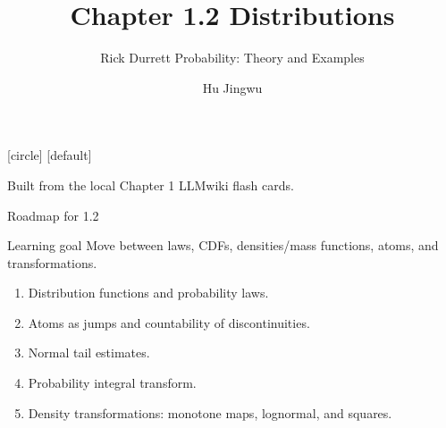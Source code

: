 [circle]
[default]

\usepackage{amsmath,amssymb,mathtools}
\usepackage{booktabs}

\newcommand{\OmegaSpace}{\Omega}
\newcommand{\F}{\mathcal{F}}
\newcommand{\B}{\mathcal{B}}
\newcommand{\R}{\mathbb{R}}
\newcommand{\Prob}{\mathbb{P}}
\newcommand{\E}{\mathbb{E}}
\newcommand{\Q}{\mathbb{Q}}
\newcommand{\one}{\mathbf{1}}
\newcommand{\vikiname}[1]{\par\smallskip{\scriptsize\color{blue!60!black}\textbf{LLMwiki:} \texttt{\detokenize{#1}}}}
\newcommand{\blankproof}{%
  \vspace{2mm}
  {\color{gray!55}\rule{\linewidth}{0.4pt}}\par\vspace{5mm}
  {\color{gray!55}\rule{\linewidth}{0.4pt}}\par\vspace{5mm}
  {\color{gray!55}\rule{\linewidth}{0.4pt}}\par\vspace{5mm}
  {\color{gray!55}\rule{\linewidth}{0.4pt}}\par
}
\newcommand{\proofblock}[1]{\ifteacher #1 \else \blankproof \fi}

\title[Chapter 1.2]{Chapter 1.2 Distributions}
\subtitle{Rick Durrett Probability: Theory and Examples}
\author{Hu Jingwu}
\date{}



\begin{frame}
  \titlepage
  \vspace{-5mm}
  \begin{center}
    \small Built from the local Chapter 1 LLMwiki flash cards.
  \end{center}
\end{frame}

\begin{frame}{Roadmap for 1.2}
  \begin{block}{Learning goal}
    Move between laws, CDFs, densities/mass functions, atoms, and transformations.
  \end{block}
  \begin{enumerate}
    \item Distribution functions and probability laws.
    \item Atoms as jumps and countability of discontinuities.
    \item Normal tail estimates.
    \item Probability integral transform.
    \item Density transformations: monotone maps, lognormal, and squares.
  \end{enumerate}
\end{frame}

